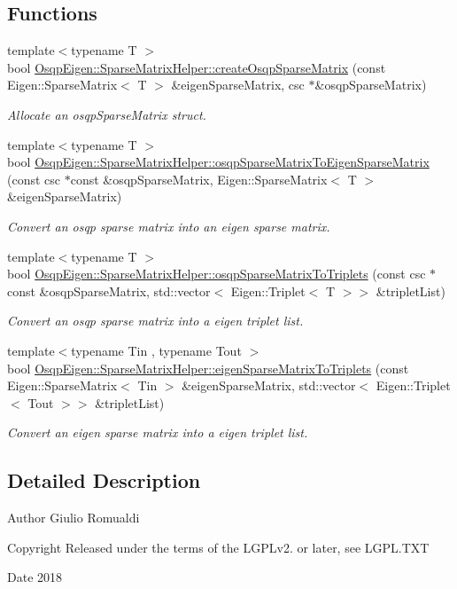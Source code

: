 \subsection*{Functions}
\begin{DoxyCompactItemize}
\item 
{\footnotesize template$<$typename T $>$ }\\bool \mbox{\hyperlink{namespaceOsqpEigen_1_1SparseMatrixHelper_afd0b552419320e79e627e5d6c9e5715c}{Osqp\+Eigen\+::\+Sparse\+Matrix\+Helper\+::create\+Osqp\+Sparse\+Matrix}} (const Eigen\+::\+Sparse\+Matrix$<$ T $>$ \&eigen\+Sparse\+Matrix, csc $\ast$\&osqp\+Sparse\+Matrix)
\begin{DoxyCompactList}\small\item\em Allocate an osqp\+Sparse\+Matrix struct. \end{DoxyCompactList}\item 
{\footnotesize template$<$typename T $>$ }\\bool \mbox{\hyperlink{namespaceOsqpEigen_1_1SparseMatrixHelper_aec1a2210ce843eda8e4000c81d886131}{Osqp\+Eigen\+::\+Sparse\+Matrix\+Helper\+::osqp\+Sparse\+Matrix\+To\+Eigen\+Sparse\+Matrix}} (const csc $\ast$const \&osqp\+Sparse\+Matrix, Eigen\+::\+Sparse\+Matrix$<$ T $>$ \&eigen\+Sparse\+Matrix)
\begin{DoxyCompactList}\small\item\em Convert an osqp sparse matrix into an eigen sparse matrix. \end{DoxyCompactList}\item 
{\footnotesize template$<$typename T $>$ }\\bool \mbox{\hyperlink{namespaceOsqpEigen_1_1SparseMatrixHelper_af45a1d77519f691542150e506b6dcdeb}{Osqp\+Eigen\+::\+Sparse\+Matrix\+Helper\+::osqp\+Sparse\+Matrix\+To\+Triplets}} (const csc $\ast$const \&osqp\+Sparse\+Matrix, std\+::vector$<$ Eigen\+::\+Triplet$<$ T $>$$>$ \&triplet\+List)
\begin{DoxyCompactList}\small\item\em Convert an osqp sparse matrix into a eigen triplet list. \end{DoxyCompactList}\item 
{\footnotesize template$<$typename Tin , typename Tout $>$ }\\bool \mbox{\hyperlink{namespaceOsqpEigen_1_1SparseMatrixHelper_ad0dac7c63fc97d0ceddadd5145d9b5c6}{Osqp\+Eigen\+::\+Sparse\+Matrix\+Helper\+::eigen\+Sparse\+Matrix\+To\+Triplets}} (const Eigen\+::\+Sparse\+Matrix$<$ Tin $>$ \&eigen\+Sparse\+Matrix, std\+::vector$<$ Eigen\+::\+Triplet$<$ Tout $>$$>$ \&triplet\+List)
\begin{DoxyCompactList}\small\item\em Convert an eigen sparse matrix into a eigen triplet list. \end{DoxyCompactList}\end{DoxyCompactItemize}


\subsection{Detailed Description}
\begin{DoxyAuthor}{Author}
Giulio Romualdi 
\end{DoxyAuthor}
\begin{DoxyCopyright}{Copyright}
Released under the terms of the L\+G\+P\+Lv2. or later, see L\+G\+P\+L.\+T\+XT 
\end{DoxyCopyright}
\begin{DoxyDate}{Date}
2018 
\end{DoxyDate}
